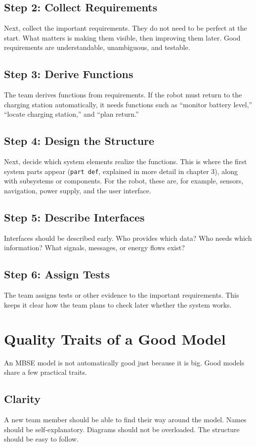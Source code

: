 \subsection{Step 2: Collect Requirements}
Next, collect the important requirements. They do not need to be perfect at the start. What matters is making them visible, then improving them later. Good requirements are understandable, unambiguous, and testable.

\subsection{Step 3: Derive Functions}
The team derives functions from requirements. If the robot must return to the charging station automatically, it needs functions such as \enquote{monitor battery level,} \enquote{locate charging station,} and \enquote{plan return.}

\subsection{Step 4: Design the Structure}
Next, decide which system elements realize the functions. This is where the first system parts appear (\texttt{part def}, explained in more detail in chapter 3), along with subsystems or components. For the robot, these are, for example, sensors, navigation, power supply, and the user interface.

\subsection{Step 5: Describe Interfaces}
Interfaces should be described early. Who provides which data? Who needs which information? What signals, messages, or energy flows exist?

\subsection{Step 6: Assign Tests}
The team assigns tests or other evidence to the important requirements. This keeps it clear how the team plans to check later whether the system works.

\section{Quality Traits of a Good Model}
An MBSE model is not automatically good just because it is big. Good models share a few practical traits.

\subsection{Clarity}
A new team member should be able to find their way around the model. Names should be self-explanatory. Diagrams should not be overloaded. The structure should be easy to follow.

